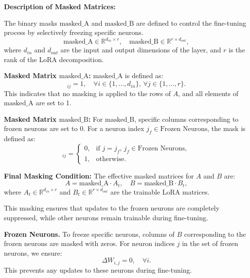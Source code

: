 \textbf{Description of Masked Matrices:}

The binary masks \(\text{masked\_A}\) and \(\text{masked\_B}\) are defined to control the fine-tuning process by selectively freezing specific neurons.
\[
	\text{masked\_A} \in \mathbb{R}^{d_{in} \times r}, \quad
	\text{masked\_B} \in \mathbb{R}^{r \times d_{out}},
\]
where \(d_{in}\) and \(d_{out}\) are the input and output dimensions of the layer, and \(r\) is the rank of the LoRA decomposition.

\textbf{Masked Matrix \(\text{masked\_A}\):}
\(\text{masked\_A}\) is defined as:
\begin{equation}
	[\text{masked\_A}]_{ij} = 1, \quad \forall i \in \{1, \dots, d_{in}\}, \, \forall j \in \{1, \dots, r\}.
\end{equation}
This indicates that no masking is applied to the rows of \(A\), and all elements of \(\text{masked\_A}\) are set to 1.

\textbf{Masked Matrix \(\text{masked\_B}\):}
For \(\text{masked\_B}\), specific columns corresponding to frozen neurons are set to 0. For a neuron index \(j_f \in \text{Frozen Neurons}\), the mask is defined as:
\begin{equation}
	[\text{masked\_B}]_{ij} = 
	\begin{cases} 
		0, & \text{if } j = j_f, \, j_f \in \text{Frozen Neurons}, \\
		1, & \text{otherwise}.
	\end{cases}
\end{equation}

\textbf{Final Masking Condition:}
The effective masked matrices for \(A\) and \(B\) are:
\begin{equation}
	A = \text{masked\_A} \cdot A_t, \quad
	B = \text{masked\_B} \cdot B_t,
\end{equation}
where \(A_t \in \mathbb{R}^{d_{in} \times r}\) and \(B_t \in \mathbb{R}^{r \times d_{out}}\) are the trainable LoRA matrices.

This masking ensures that updates to the frozen neurons are completely suppressed, while other neurons remain trainable during fine-tuning.

\textbf{Frozen Neurons.} To freeze specific neurons, columns of \(B\) corresponding to the frozen neurons are masked with zeros. For neuron indices \(j\) in the set of frozen neurons, we ensure:
\begin{equation}
	\Delta W_{i,j} = 0, \quad \forall i.
\end{equation}
This prevents any updates to these neurons during fine-tuning.

